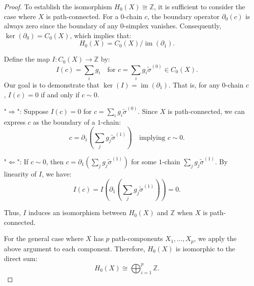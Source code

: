 \begin{proof}
    To establish the isomorphism $H_0(X) \cong \mathbb{Z}$, it is sufficient to consider the case where $X$ is path-connected. For a $0$-chain $c$, the boundary operator $\partial_0(c)$ is always zero since the boundary of any $0$-simplex vanishes. Consequently, $\ker(\partial_0) = C_0(X)$, which implies that:
    \[
        H_0(X) = C_0(X) / \operatorname{im}(\partial_1).
    \]

    Define the map $I: C_0(X) \to \mathbb{Z}$ by:
    \[
        I(c) = \sum_i g_i \quad \text{for } c = \sum_i g_i \tilde{\sigma}^{(0)} \in C_0(X).
    \]
    Our goal is to demonstrate that $\ker(I) = \operatorname{im}(\partial_1)$. That is, for any $0$-chain $c$, $I(c) = 0$ if and only if $c \sim 0$.

    "$\Rightarrow$": Suppose $I(c) = 0$ for $c = \sum_i g_i \tilde{\sigma}^{(0)}$. Since $X$ is path-connected, we can express $c$ as the boundary of a $1$-chain:
    \[
        c = \partial_1 \left( \sum_j g_j \tilde{\sigma}^{(1)} \right) \quad \text{implying } c \sim 0.
    \]

    "$\Leftarrow$": If $c \sim 0$, then $c = \partial_1 \left( \sum_j g_j \tilde{\sigma}^{(1)} \right)$ for some $1$-chain $\sum_j g_j \tilde{\sigma}^{(1)}$. By linearity of $I$, we have:
    \[
        I(c) = I \left( \partial_1 \left( \sum_j g_j \tilde{\sigma}^{(1)} \right) \right) = 0.
    \]

    Thus, $I$ induces an isomorphism between $H_0(X)$ and $\mathbb{Z}$ when $X$ is path-connected.

    For the general case where $X$ has $p$ path-components $X_1, \ldots, X_p$, we apply the above argument to each component. Therefore, $H_0(X)$ is isomorphic to the direct sum:
    \[
        H_0(X) \cong \bigoplus_{i=1}^{p} \mathbb{Z}.
    \]
\end{proof}

